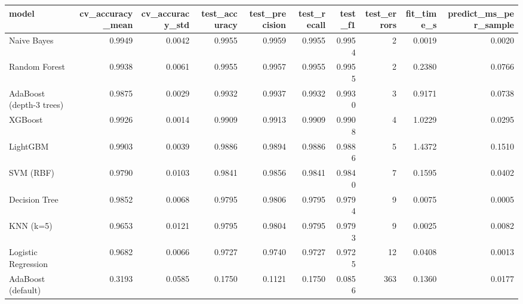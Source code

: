\begin{tabular}{lrrrrrrrrr}
\toprule
model & cv_accuracy_mean & cv_accuracy_std & test_accuracy & test_precision & test_recall & test_f1 & test_errors & fit_time_s & predict_ms_per_sample \\
\midrule
Naive Bayes & 0.9949 & 0.0042 & 0.9955 & 0.9959 & 0.9955 & 0.9954 & 2 & 0.0019 & 0.0020 \\
Random Forest & 0.9938 & 0.0061 & 0.9955 & 0.9957 & 0.9955 & 0.9955 & 2 & 0.2380 & 0.0766 \\
AdaBoost (depth-3 trees) & 0.9875 & 0.0029 & 0.9932 & 0.9937 & 0.9932 & 0.9930 & 3 & 0.9171 & 0.0738 \\
XGBoost & 0.9926 & 0.0014 & 0.9909 & 0.9913 & 0.9909 & 0.9908 & 4 & 1.0229 & 0.0295 \\
LightGBM & 0.9903 & 0.0039 & 0.9886 & 0.9894 & 0.9886 & 0.9886 & 5 & 1.4372 & 0.1510 \\
SVM (RBF) & 0.9790 & 0.0103 & 0.9841 & 0.9856 & 0.9841 & 0.9840 & 7 & 0.1595 & 0.0402 \\
Decision Tree & 0.9852 & 0.0068 & 0.9795 & 0.9806 & 0.9795 & 0.9794 & 9 & 0.0075 & 0.0005 \\
KNN (k=5) & 0.9653 & 0.0121 & 0.9795 & 0.9804 & 0.9795 & 0.9793 & 9 & 0.0025 & 0.0082 \\
Logistic Regression & 0.9682 & 0.0066 & 0.9727 & 0.9740 & 0.9727 & 0.9725 & 12 & 0.0408 & 0.0013 \\
AdaBoost (default) & 0.3193 & 0.0585 & 0.1750 & 0.1121 & 0.1750 & 0.0856 & 363 & 0.1360 & 0.0177 \\
\bottomrule
\end{tabular}
